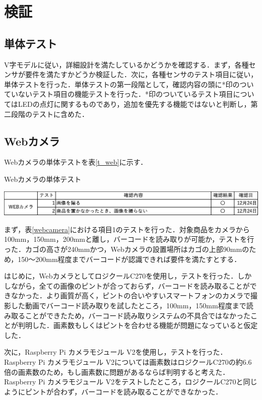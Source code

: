 

\section{検証}

\subsection{単体テスト}

V字モデルに従い，詳細設計を満たしているかどうかを確認する．まず，各種センサが要件を満たすかどうか検証した．次に，各種センサのテスト項目に従い，単体テストを行った．単体テストの第一段階として，確認内容の頭に*印のついていないテスト項目の機能テストを行った．*印のついているテスト項目についてはLEDの点灯に関するものであり，追加を優先する機能ではないと判断し，第二段階のテストに含めた．


\subsection*{Webカメラ}


Webカメラの単体テストを表\ref{t_web}に示す．


\begin{table}[htbp]
\centering
\caption{Webカメラの単体テスト}
\includegraphics[width = 15cm]{./picture/tantai_web.eps}
\label{t_web}
\end{table}

まず，表\ref{webcamera}における項目1のテストを行った．対象商品をカメラから100mm，150mm，200mmと離し，バーコードを読み取りが可能か，テストを行った．カゴの高さが240mmかつ，Webカメラの設置場所はカゴの上部90mmのため，150～200mm程度までバーコードが認識できれば要件を満たすとする．

はじめに，WebカメラとしてロジクールC270を使用し，テストを行った．しかしながら，全ての画像のピントが合っておらず，バーコードを読み取ることができなかった．より画質が高く，ピントの合いやすいスマートフォンのカメラで撮影した動画でバーコード読み取りを試したところ，100mm，150mm程度まで読み取ることができたため，バーコード読み取りシステムの不具合ではなかったことが判明した．画素数もしくはピントを合わせる機能が問題になっていると仮定した．

次に，Raspberry Pi カメラモジュール V2を使用し，テストを行った．Raspberry Pi カメラモジュール V2については画素数はロジクールC270の約6.6倍の画素数のため，もし画素数に問題があるならば判明すると考えた．Raspberry Pi カメラモジュール V2をテストしたところ，ロジクールC270と同じようにピントが合わず，バーコードを読み取ることができなかった．

